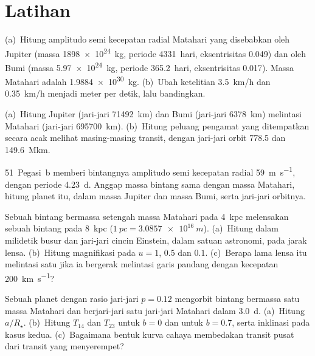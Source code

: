 \section{Latihan}

\begin{exercise}[$\star$]\label{exo:b3:exoplanets:1}
(a)~Hitung amplitudo semi kecepatan radial Matahari yang disebabkan
oleh Jupiter (massa \qty{1898e24}{kg}, periode \num{4331}~hari, eksentrisitas
0.049) dan oleh Bumi (massa \qty{5.97e24}{kg}, periode \num{365.2}~hari,
eksentrisitas 0.017). Massa Matahari adalah \qty{1.9884e30}{kg}.
(b)~Ubah ketelitian \qty{3.5}{km/h} dan \qty{0.35}{km/h} menjadi
meter per detik, lalu bandingkan.
\end{exercise}

\begin{exercise}[$\star$]\label{exo:b3:exoplanets:2}
(a)~Hitung  Jupiter (jari-jari \qty{71492}{km}) dan
Bumi (jari-jari \qty{6378}{km}) melintasi Matahari (jari-jari
\qty{695700}{km}). (b)~Hitung peluang pengamat yang ditempatkan secara acak
melihat masing-masing transit, dengan jari-jari orbit \num{778.5}
dan \qty{149.6}{\mega km}.
\end{exercise}

\begin{exercise}[$\star$]\label{exo:b3:exoplanets:3}
51~Pegasi~b memberi bintangnya amplitudo semi kecepatan radial
\qty{59}{m.s^{-1}}, dengan periode \qty{4.23}{d}. Anggap massa bintang sama
dengan massa Matahari, hitung  planet itu, dalam massa Jupiter
dan massa Bumi, serta jari-jari orbitnya.
\end{exercise}

\begin{exercise}[$\star$]\label{exo:b3:exoplanets:4}
Sebuah bintang bermassa setengah massa Matahari pada \qty{4}{kpc} melensakan
sebuah bintang pada \qty{8}{kpc} ($\qty{1}{pc} = \qty{3.0857e16}{m}$). (a)~Hitung  dalam milidetik busur
dan jari-jari cincin Einstein, dalam satuan astronomi, pada jarak lensa. (b)~Hitung
magnifikasi pada $u = 1$, $0.5$ dan $0.1$. (c)~Berapa lama lensa itu
melintasi satu  jika ia bergerak melintasi
garis pandang dengan kecepatan
\qty{200}{km.s^{-1}}?
\end{exercise}

\begin{exercise}[$\star\star$]\label{exo:b3:exoplanets:5}
Sebuah planet dengan rasio jari-jari $p = 0.12$ mengorbit bintang bermassa satu
massa Matahari dan berjari-jari satu jari-jari Matahari dalam \qty{3.0}{d}. (a)~Hitung $a/R_\star$. (b)~Hitung
$T_{14}$ dan $T_{23}$ untuk $b = 0$ dan untuk $b = 0.7$, serta inklinasi
pada kasus kedua. (c)~Bagaimana bentuk kurva cahaya membedakan transit pusat
dari transit yang menyerempet?
\end{exercise}


